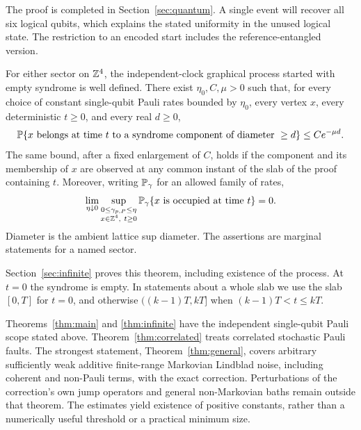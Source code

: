 The proof is completed in Section~\ref{sec:quantum}. A single event
will recover all six logical qubits, which explains the stated
uniformity in the unused logical state. The restriction to an encoded
start includes the reference-entangled version.

\begin{theorem}\label{thm:infinite}
For either sector on \(\mathbb Z^4\), the independent-clock graphical process
started with empty syndrome is well defined. There exist
\(\eta_0,C,\mu>0\) such that, for every choice of constant
single-qubit Pauli rates bounded by \(\eta_0\), every vertex \(x\), every
deterministic \(t\ge0\), and every real \(d\ge0\),
\begin{equation}\label{eq:infinite-main}
 \mathbb P\{x\text{ belongs at time }t
   \text{ to a syndrome component of diameter }\ge d\}
       \le Ce^{-\mu d}.
\end{equation}
The same bound, after a fixed enlargement of \(C\), holds if the
component and its membership of \(x\) are observed at any common
instant of the slab of the proof containing \(t\).
Moreover, writing \(\mathbb P_\gamma\) for an allowed family of rates,
\[
 \lim_{\eta\downarrow0}
 \sup_{\substack{0\le\gamma_{p,P}\le\eta\\x\in\mathbb Z^4,\ t\ge0}}
 \mathbb P_\gamma\{x\text{ is occupied at time }t\}=0.
\]
Diameter is the ambient lattice sup diameter. The assertions are
marginal statements for a named sector.
\end{theorem}

Section~\ref{sec:infinite} proves this theorem, including existence of
the process. At \(t=0\) the syndrome is empty. In statements about a
whole slab we use the slab \([0,T]\) for \(t=0\), and otherwise
\(((k-1)T,kT]\) when \((k-1)T<t\le kT\).

Theorems~\ref{thm:main} and \ref{thm:infinite} have the independent
single-qubit Pauli scope stated above.
Theorem~\ref{thm:correlated} treats correlated stochastic Pauli faults.
The strongest statement, Theorem~\ref{thm:general}, covers arbitrary
sufficiently weak additive finite-range Markovian Lindblad noise,
including coherent and non-Pauli terms, with the exact correction.
Perturbations of the correction's own jump operators and general
non-Markovian baths remain outside that theorem.
The estimates yield existence of positive constants, rather than a
numerically useful threshold or a practical minimum size.
